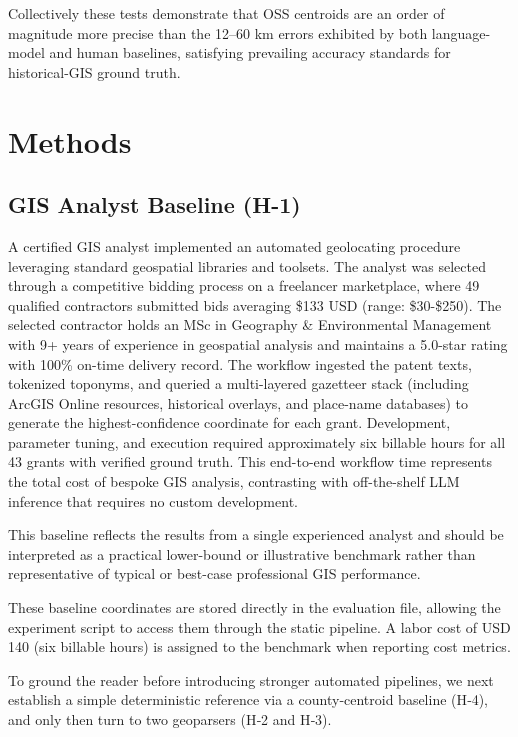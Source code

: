 Collectively these tests demonstrate that OSS centroids are an order of
magnitude more precise than the 12--60 km errors exhibited by both
language-model and human baselines, satisfying prevailing accuracy
standards for historical-GIS ground truth.

\section{Methods}\label{methods}

\subsection{GIS Analyst Baseline
(H-1)}\label{gis-analyst-baseline-h-1}

A certified GIS analyst \citep{Bashorun2025_gis} implemented an
automated geolocating procedure leveraging standard geospatial libraries
and toolsets. The analyst was selected through a competitive bidding
process on a freelancer marketplace, where 49 qualified contractors
submitted bids averaging \$133 USD (range: \$30-\$250). The selected
contractor holds an MSc in Geography \& Environmental Management with 9+
years of experience in geospatial analysis and maintains a 5.0-star
rating with 100\% on-time delivery record. The workflow ingested the
patent texts, tokenized toponyms, and queried a multi-layered gazetteer
stack (including ArcGIS Online resources, historical overlays, and
place-name databases) to generate the highest-confidence coordinate for
each grant. Development, parameter tuning, and execution required
approximately six billable hours for all 43 grants with verified ground
truth. This end-to-end workflow time represents the total cost of
bespoke GIS analysis, contrasting with off-the-shelf LLM inference that
requires no custom development.

This baseline reflects the results from a single experienced analyst and
should be interpreted as a practical lower-bound or illustrative
benchmark rather than representative of typical or best-case
professional GIS performance.

These baseline coordinates are stored directly in the evaluation file,
allowing the experiment script to access them through the static
pipeline. A labor cost of USD 140 (six billable hours) is assigned to
the benchmark when reporting cost metrics.

To ground the reader before introducing stronger automated pipelines, we
next establish a simple deterministic reference via a county‑centroid
baseline (H‑4), and only then turn to two geoparsers (H‑2 and H‑3).

